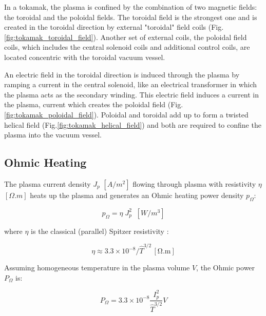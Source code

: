 In a tokamak, the plasma is confined by the combination of two magnetic fields: the toroidal and the poloidal fields. The toroidal field is the strongest one and is created in the toroidal direction by external "toroidal" field coils (Fig.\ref{fig:tokamak_toroidal_field}). Another set  of  external  coils, the poloidal field coils, which includes the central solenoid coils and additional control coils, are located concentric with the toroidal vacuum vessel.

An electric field in the toroidal direction is induced through the plasma by ramping a current in the central solenoid, like an electrical transformer in which the plasma acts as the secondary winding. This electric field induces a current in the plasma, current which creates the poloidal field (Fig.\ref{fig:tokamak_poloidal_field}). Poloidal and toroidal add up to form a twisted helical field (Fig.\ref{fig:tokamak_helical_field}) and both are required to confine the plasma into the vacuum vessel. 





\subsection{Ohmic Heating}
The plasma current density $J_p$ $[\si{A/m^2}]$ flowing through plasma with resistivity $\eta$ $[\si{\Omega.m}]$ heats up the plasma and generates an Ohmic heating power density $p_\Omega$:

\begin{equation}\label{eq:ohmic_power_density}
p_\Omega = \eta \; J_p^2 \;\; \si{[W/m^3]}
\end{equation}

where $\eta$ is the classical (parallel) Spitzer resistivity \cite[Eq.(11.15)]{Freidberg2007}:

\begin{equation}\label{eq:Spitzer_resistivity}
\eta
\approx
3.3 \times 10^{-8} / \hat T^{3/2}  \, \mathrm{[\Omega.m]}
\end{equation}


Assuming homogeneous temperature in the plasma volume $V$, the Ohmic power $P_\Omega$ is:

\begin{equation}\label{eq:ohmic_power}
P_\Omega
=
3.3 \times 10^{-8} \frac{ I_p^2 }{ \hat T^{3/2} } V
\end{equation}

